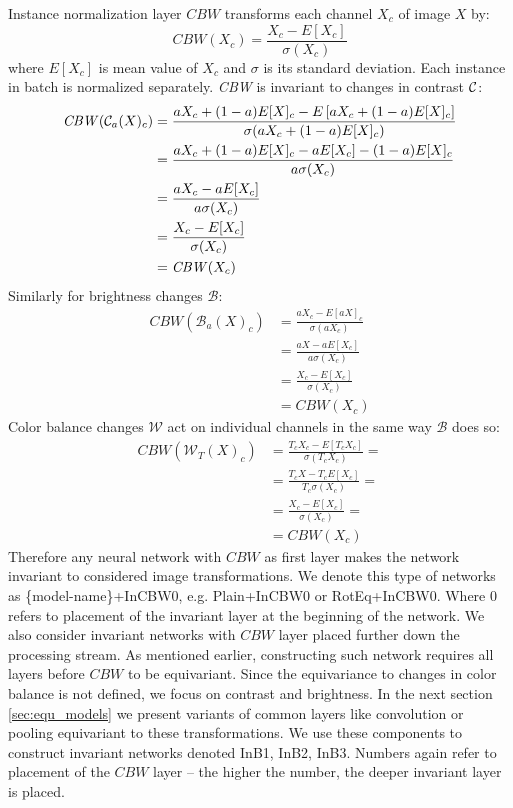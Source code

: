 Instance normalization layer $\mathit{CBW}$ transforms each channel
$X_c$ of image $X$ by:
$$ \mathit{CBW}(X_c) = \frac{X_c-E[X_c]}{\sigma(X_c)} $$
where $E[X_c]$ is mean value of $X_c$ and $\sigma$ is its standard deviation.
Each instance in batch is normalized separately.
\textit{CBW} is invariant to changes in contrast $\mathcal{C}$:
\begin{align*}
    \mathit{CBW}(\mathcal{C}_a(X)_c) &=
    \frac{aX_c+(1-a)E[X]_c - E\left[aX_c+(1-a)E[X]_c\right]}{\sigma(aX_c+(1-a)E[X]_c)} \\
    &= \frac{aX_c+(1-a)E[X]_c - aE[X_c]-(1-a)E[X]_c}{a\sigma(X_c)} \\
    &= \frac{aX_c-aE[X_c]}{a\sigma(X_c)} \\
    &= \frac{X_c-E[X_c]}{\sigma(X_c)} \\
    &= \mathit{CBW}(X_c)
\end{align*}
Similarly for brightness changes $\mathcal{B}$:
\begin{align*}
    \mathit{CBW}(\mathcal{B}_a(X)_c) &=
    \frac{aX_c - E\left[aX\right]_c}{\sigma(aX_c)} \\
    &= \frac{aX-aE[X_c]}{a\sigma(X_c)} \\
    &= \frac{X_c-E[X_c]}{\sigma(X_c)} \\
    &= \mathit{CBW}(X_c)
\end{align*}
Color balance changes $\mathcal{W}$ act on individual channels in the same way
$\mathcal{B}$ does so:
\begin{align*}
    \mathit{CBW}(\mathcal{W}_T(X)_c) &=
    \frac{T_cX_c - E\left[T_cX_c\right]}{\sigma(T_cX_c)} = \\
    &= \frac{T_cX-T_cE[X_c]}{T_c\sigma(X_c)} = \\
    &= \frac{X_c-E[X_c]}{\sigma(X_c)} = \\
    &= \mathit{CBW}(X_c)
\end{align*}
Therefore any neural network with $\mathit{CBW}$ as first layer
makes the network invariant to considered image transformations.
We denote this type of networks as \{model-name\}+InCBW0, e.g. Plain+InCBW0 or
RotEq+InCBW0. Where 0 refers to placement of the invariant layer at the
beginning of the network. We also consider invariant networks with $\mathit{CBW}$
layer placed further down the processing stream. As mentioned earlier,
constructing such network requires all layers before $\mathit{CBW}$ to be
equivariant. Since the equivariance to changes in color balance is not defined,
we focus on contrast and brightness. In the next section \ref{sec:equ_models} we
present variants of common layers like convolution or pooling equivariant to
these transformations. We use these components to construct invariant networks
denoted InB1, InB2, InB3. Numbers again refer to
placement of the $\mathit{CBW}$ layer -- the higher the number, the deeper
invariant layer is placed.

